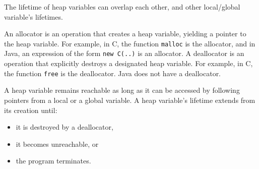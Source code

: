 \documentclass[a4paper, openany]{memoir}
\begin{document}
\begin{figure}[H]
    \centering
\end{figure}
\noindent The lifetime of heap variables can overlap each other, and other local/global variable's lifetimes.

An allocator is an operation that creates a heap variable, yielding a pointer to the heap variable. For example, in C, the function \texttt{malloc} is the allocator, and in Java, an expression of the form \texttt{new C(..)} is an allocator. A deallocator is an operation that explicitly destroys a designated heap variable. For example, in C, the function \texttt{free} is the deallocator. Java does not have a deallocator.

A heap variable remains reachable as long as it can be accessed by following pointers from a local or a global variable. A heap variable's lifetime extends from its creation until:
\begin{itemize}
    \item it is destroyed by a deallocator,
    \item it becomes unreachable, or
    \item the program terminates.
\end{itemize}
\end{document}
